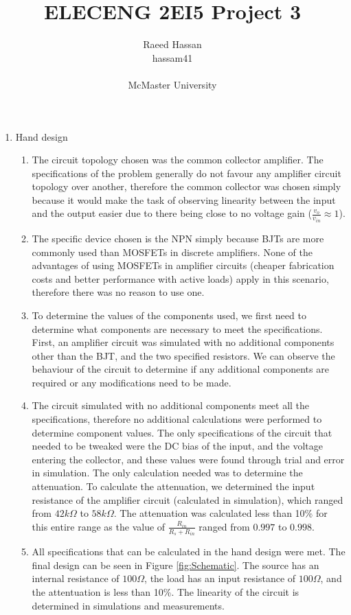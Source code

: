 \documentclass[12pt]{article}
\title{ELECENG 2EI5 Project 3}
\author{Raeed Hassan \\ hassam41 \\  \\ McMaster University}
\begin{document}
\maketitle
\pagebreak

\begin{enumerate}
\item Hand design
\begin{enumerate}
    \item
    The circuit topology chosen was the common collector amplifier. The specifications of the problem generally do not favour any amplifier circuit topology over another, therefore the common collector was chosen simply because it would make the task of observing linearity between the input and the output easier due to there being close to no voltage gain ($\frac{v_o}{v_{in}} \approx 1$). 
    \item
    The specific device chosen is the NPN simply because BJTs are more commonly used than MOSFETs in discrete amplifiers. None of the advantages of using MOSFETs in amplifier circuits (cheaper fabrication costs and better performance with active loads) apply in this scenario, therefore there was no reason to use one. 
    \item
    To determine the values of the components used, we first need to determine what components are necessary to meet the specifications. First, an amplifier circuit was simulated with no additional components other than the BJT, and the two specified resistors. We can observe the behaviour of the circuit to determine if any additional components are required or any modifications need to be made.   
    \item
    The circuit simulated with no additional components meet all the specifications, therefore no additional calculations were performed to determine component values. The only specifications of the circuit that needed to be tweaked were the DC bias of the input, and the voltage entering the collector, and these values were found through trial and error in simulation. The only calculation needed was to determine the attenuation. To calculate the attenuation, we determined the input resistance of the amplifier circuit (calculated in simulation), which ranged from $42k\Omega$ to $58k\Omega$. The attenuation was calculated less than 10\% for this entire range as the value of $\frac{R_{in}}{R_s + R_{in}}$ ranged from $0.997$ to $0.998$.
    \item
    All specifications that can be calculated in the hand design were met. The final design can be seen in Figure \ref{fig:Schematic}. The source has an internal resistance of $100\Omega$, the load has an input resistance of $100\Omega$, and the attentuation is less than 10\%. The linearity of the circuit is determined in simulations and measurements.

\end{enumerate}
\end{enumerate}
\end{document}
